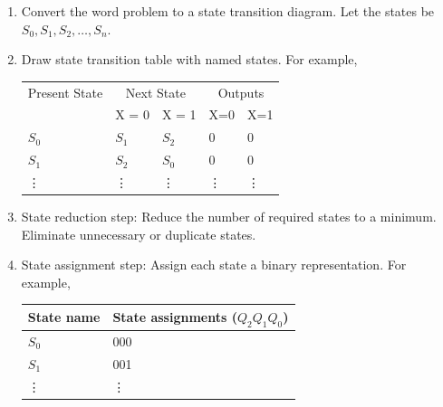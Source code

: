 \documentclass{article}
\begin{document}
\begin{enumerate}
  \item Convert the word problem to a state transition diagram. Let the states
    be $S_0, S_1, S_2, \dots, S_n$.
  \item Draw state transition table with named states. For example,\\
    \begin{tabular}{lllll}
      \toprule
      Present State & \multicolumn{2}{c}{Next State} & \multicolumn{2}{c}{Outputs} \\
      &  X = 0 & X = 1& X=0 & X=1  \\
      \midrule
       $S_0$ & $S_1$ & $S_2$ & 0 & 0\\
      $S_1$ & $S_2$ & $S_0$ & 0 & 0\\
      \vdots & \vdots & \vdots & \vdots & \vdots  \\
      \bottomrule
    \end{tabular}
   \item State reduction step: Reduce the number of required states to a
     minimum. Eliminate unnecessary or duplicate states.
   \item State assignment step: Assign each state a binary representation. For
     example, \\
     \begin{tabular}{ll}
       \toprule
       State name & State assignments ($Q_2 Q_1 Q_0$)\\
       \midrule
       $S_0$ & 000 \\
       $S_1$ & 001 \\
       \vdots & \vdots\\
       \bottomrule
     \end{tabular}
     

\end{enumerate}
\end{document}
